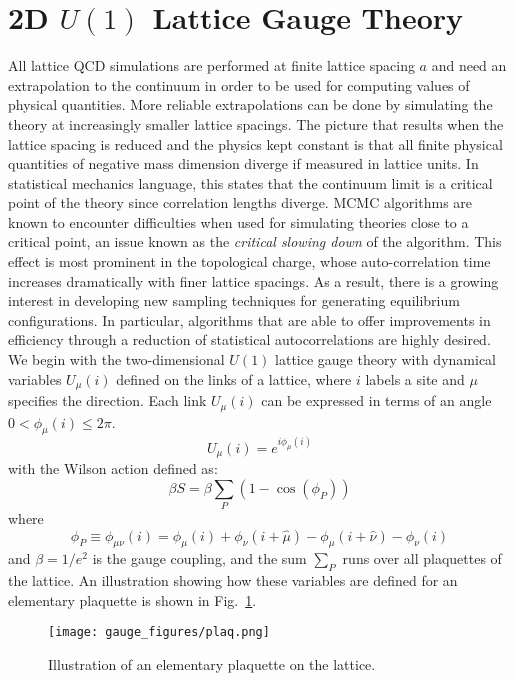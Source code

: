 \section{2D \texorpdfstring{$U(1)$}{U (1)} Lattice Gauge Theory}%
\label{sec:l2hmc_u1} 
All lattice QCD simulations are performed at finite
lattice spacing $a$ and need an extrapolation to the continuum in order to be
used for computing values of physical quantities.
%
More reliable extrapolations can be done by simulating the theory at
increasingly smaller lattice spacings.
%
The picture that results when the lattice spacing is reduced and the physics
kept constant is that all finite physical quantities of negative mass dimension
diverge if measured in lattice units.
%
In statistical mechanics language, this states that the continuum limit is a
critical point of the theory since correlation lengths diverge.
%
MCMC algorithms are known to encounter difficulties when used for simulating
theories close to a critical point, an issue known as the \emph{critical slowing
down} of the algorithm.
%
This effect is most prominent in the topological charge, whose auto-correlation
time increases dramatically with finer lattice spacings.
%
As a result, there is a growing interest in developing new sampling techniques
for generating equilibrium configurations. 
%
In particular, algorithms that are able to offer improvements in efficiency
through a reduction of statistical autocorrelations are highly desired. 
%
We begin with the two-dimensional $U{(1)}$ lattice gauge theory with dynamical
variables $U_{\mu}{(i)}$ defined on the links of a lattice, where $i$ labels a
site and $\mu$ specifies the direction.
%
Each link $U_{\mu}{(i)}$ can be expressed in terms of an angle $0 <
\phi_{\mu}{(i)} \leq 2 \pi$.
%
\begin{equation}
    U_{\mu}{(i)} = e^{i\phi_{\mu}{(i)}}
    \label{eq:link_variable}
\end{equation}
%
with the Wilson action defined as:
%
\begin{equation}
    \beta S = \beta \sum_{P}{(1 - \cos{(\phi_{P})})}
    \label{eq:wilson_action}
\end{equation}
%
where
%
\begin{equation}
    \phi_{P} \equiv \phi_{\mu\nu}(i) = 
        \phi_{\mu}{(i)} + \phi_{\nu}{(i + \hat{\mu})} 
        - \phi_{\mu}{(i + \hat{\nu})} - \phi_{\nu}{(i)}
    \label{eq:phi_plaquette}
\end{equation}
and $\beta = 1/e^{2}$ is the gauge coupling, and the sum $\sum_{P}$ runs over
all plaquettes of the lattice.
%
An illustration showing how these variables are defined for an elementary
plaquette is shown in Fig.~\ref{fig:plaquette}.
%
\begin{figure}[htpb]
  \centering
  \texttt{[image: gauge\_figures/plaq.png]}
  \caption{Illustration of an elementary plaquette on the lattice.}%
\label{fig:plaquette}
\end{figure}

